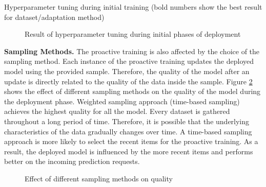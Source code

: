 \begin{table*}[!h]
\centering
\begin{adjustbox}{max width=\textwidth}

\end{adjustbox}
\caption{Hyperparameter tuning during initial training (bold numbers show the best result for dataset/adaptation method)}
\label{hyper-param-table}
\end{table*}

\begin{figure}[!h]
\centering
\resizebox{\columnwidth}{!}{}
\caption{Result of hyperparameter tuning during initial phases of deployment}
\label{hyper-param-figure}
\end{figure}

\textbf{Sampling Methods.}
The proactive training is also affected by the choice of the sampling method.
Each instance of the proactive training updates the deployed model using the provided sample.
Therefore, the quality of the model after an update is directly related to the quality of the data inside the sample.
Figure \ref{sampling-method-figure} shows the effect of different sampling methods on the quality of the model during the deployment phase.
Weighted sampling approach (time-based sampling) achieves the highest quality for all the model.
Every dataset is gathered throughout a long period of time.
Therefore, it is possible that the underlying characteristics of the data gradually changes over time.
A time-based sampling approach is more likely to select the recent items for the proactive training.
As a result, the deployed model is influenced by the more recent items and performs better on the incoming prediction requests.

\begin{figure}[!h]
\centering
\resizebox{\columnwidth}{!}{}
\caption{Effect of different sampling methods on quality}
\label{sampling-method-figure}
\end{figure}

